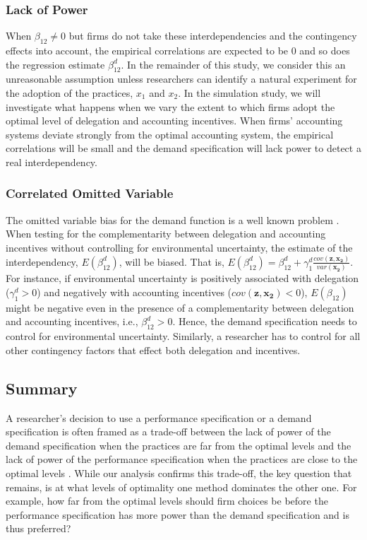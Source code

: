 \documentclass[12pt]{article}
\begin{document}
\subsubsection{Lack of Power}

When $\beta_{12} \neq0$ but firms do not take these interdependencies and the contingency effects into account, the empirical correlations are expected to be 0 and so does the regression estimate $\beta_{12}^d$. In the remainder of this study, we consider this an unreasonable assumption unless researchers can identify a natural experiment for the adoption of the practices, $x_1$ and $x_2$. In the simulation study, we will investigate what happens when we vary the extent to which firms adopt the optimal level of delegation and accounting incentives. When firms' accounting systems deviate strongly from the optimal accounting system, the empirical correlations will be small and the demand specification will lack power to detect a real interdependency.

\subsubsection{Correlated Omitted Variable}

The omitted variable bias for the demand function is a well known problem \citep{arora_testing_1996,grabner_management_2013,hofmann_organizational_2017}. When testing for the complementarity between delegation and accounting incentives without controlling for environmental uncertainty, the estimate of the interdependency, $E(\beta_{12}^d)$, will be biased. That is, $E(\beta_{12}^d)=\beta_{12}^d+\gamma_{1}^d \frac{cov(\mathbf{z}, \mathbf{x_2})}{var(\mathbf{x_2})}$. For instance, if environmental uncertainty is positively associated with delegation ($\gamma_{1}^d>0$) and negatively with accounting incentives ($cov(\mathbf{z}, \mathbf{x_2})<0$), $E(\beta_{12})$ might be negative even in the presence of a complementarity between delegation and accounting incentives, i.e., $\beta_{12}^d>0$. Hence, the demand specification needs to control for environmental uncertainty. Similarly, a researcher has to control for all other contingency factors that effect both delegation and incentives.

\subsection{Summary}

A researcher's decision to use a performance specification or a demand specification is often framed as a trade-off between the lack of power of the demand specification when the practices are far from the optimal levels and the lack of power of the performance specification when the practices are close to the optimal levels \citep{grabner_management_2013, aral_three-way_2012,johansson_testing_2018}. While our analysis confirms this trade-off, the key question that remains, is at what levels of optimality one method dominates the other one. For example, how far from the optimal levels should firm choices be before the performance specification has more power than the demand specification and is thus preferred?
\end{document}
